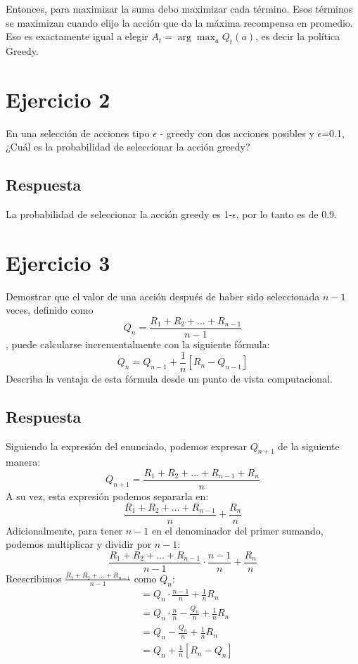 \documentclass[12pt,a4paper]{article}
\begin{document}
Entonces, para maximizar la suma debo maximizar cada término. Esos términos
se maximizan cuando elijo la acción que da la máxima recompensa en promedio. Eso es
exactamente igual a elegir $ A_t = \arg\max_a Q_t(a) $, es decir la política Greedy.

\section{Ejercicio 2}

En una selección de acciones tipo $\epsilon$ - greedy con dos acciones posibles y $\epsilon$=0.1, ¿Cuál es la probabilidad de seleccionar la acción greedy?

\subsection{Respuesta}

La probabilidad de seleccionar la acción greedy es 1-$\epsilon$, por lo tanto es de 0.9.

\section{Ejercicio 3}

Demostrar que el valor de una acción después de haber sido seleccionada $n-1$ veces, definido como 
$$Q_n = \frac{R_1 + R_2 + \ldots + R_{n-1}}{n-1}$$
, puede calcularse incrementalmente con la siguiente fórmula:
$$Q_n = Q_{n-1} + \frac{1}{n}[R_n - Q_{n-1}]$$
Describa la ventaja de esta fórmula desde un punto de vista computacional.

\subsection{Respuesta}

Siguiendo la expresión del enunciado, podemos expresar $Q_{n+1}$ de la siguiente manera:
$$Q_{n+1} = \frac{R_1 + R_2 + \ldots + R_{n-1} + R_n}{n}$$
A su vez, esta expresión podemos separarla en:
$$\frac{R_1 + R_2 + \ldots + R_{n-1}}{n} + \frac{R_n}{n}$$
Adicionalmente, para tener $n-1$ en el denominador del primer sumando, podemos multiplicar y dividir por $n-1$:
$$\frac{R_1 + R_2 + \ldots + R_{n-1}}{n-1} \cdot \frac{n-1}{n} + \frac{R_n}{n}$$
Reescribimos $\frac{R_1 + R_2 + \ldots + R_{n-1}}{n-1}$ como $Q_n$:
\begin{align}
\tag{1} &= Q_n \cdot \frac{n-1}{n} + \frac{1}{n}R_n \\
\tag{2} &= Q_n \cdot \frac{n}{n} - \frac{Q_n}{n} + \frac{1}{n}R_n \\
\tag{3} &= Q_n - \frac{Q_n}{n} + \frac{1}{n}R_n \\
\tag{4} &= Q_n + \frac{1}{n}[R_n - Q_n]
\end{align}
\end{document}
